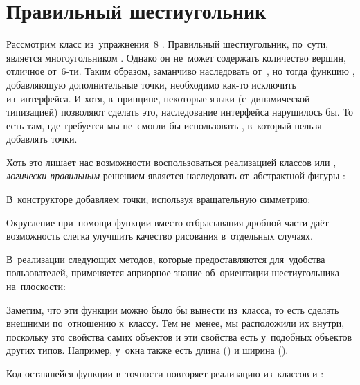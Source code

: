 
\section{Правильный шестиугольник}
Рассмотрим класс  из~упражнения~8 . Правильный шестиугольник, по~сути, является многоугольником . Однако он не~может содержать количество вершин, отличное от~6-ти. Таким образом, заманчиво наследовать от~, но тогда функцию , добавляющую дополнительные точки, необходимо как-то исключить из~интерфейса. И хотя, в~принципе, некоторые языки (с~динамической типизацией) позволяют сделать это, наследование интерфейса нарушилось бы. То есть там, где требуется  мы не~смогли бы использовать , в~который нельзя добавлять точки.

Хоть это лишает нас возможности воспользоваться реализацией классов  или , \emph{логически правильным} решением является наследовать от~абстрактной фигуры :

В~конструкторе добавляем точки, используя вращательную симметрию:

\noindent Округление при~помощи функции  вместо отбрасывания дробной части даёт возможность слегка улучшить качество рисования в~отдельных случаях.

В~реализации следующих методов, которые предоставляются для~удобства пользователей, применяется априорное знание об~ориентации шестиугольника на~плоскости:

Заметим, что эти функции можно было бы вынести из~класса, то есть сделать внешними по~отношению к~классу. Тем не~менее, мы расположили их внутри, поскольку это свойства самих объектов и эти свойства есть у~подобных объектов других типов. Например, у~окна также есть длина () и ширина ().

Код оставшейся функции  в~точности повторяет реализацию из~классов  и :


